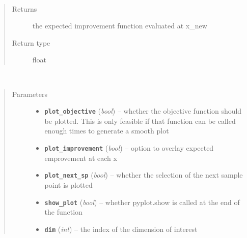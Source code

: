 \documentclass[letterpaper,10pt,english]{sphinxmanual}
\begin{document}
\begin{fulllineitems}
\begin{fulllineitems}
\end{fulllineitems}


\begin{fulllineitems}
\label{index:smbo.smb_optimizer.smb_optimizer.exp_improvement}~\begin{quote}\begin{description}
\item[{Returns}] \leavevmode
the expected improvement function evaluated at x\_new

\item[{Return type}] \leavevmode
float

\end{description}\end{quote}

\end{fulllineitems}


\begin{fulllineitems}
\label{index:smbo.smb_optimizer.smb_optimizer.plot1d}~\begin{quote}\begin{description}
\item[{Parameters}] \leavevmode\begin{itemize}
\item {} 
\textbf{\texttt{plot\_objective}} (\emph{bool}) -- whether the objective function should be plotted. This is only feasible if that function can be called enough times to generate a smooth plot

\item {} 
\textbf{\texttt{plot\_improvement}} (\emph{bool}) -- option to overlay expected emprovement at each x

\item {} 
\textbf{\texttt{plot\_next\_sp}} (\emph{bool}) -- whether the selection of the next sample point is plotted

\item {} 
\textbf{\texttt{show\_plot}} (\emph{bool}) -- whether pyplot.show is called at the end of the function

\item {} 
\textbf{\texttt{dim}} (\emph{int}) -- the index of the dimension of interest


\end{itemize}
\end{description}
\end{quote}
\end{fulllineitems}
\end{fulllineitems}
\end{document}
